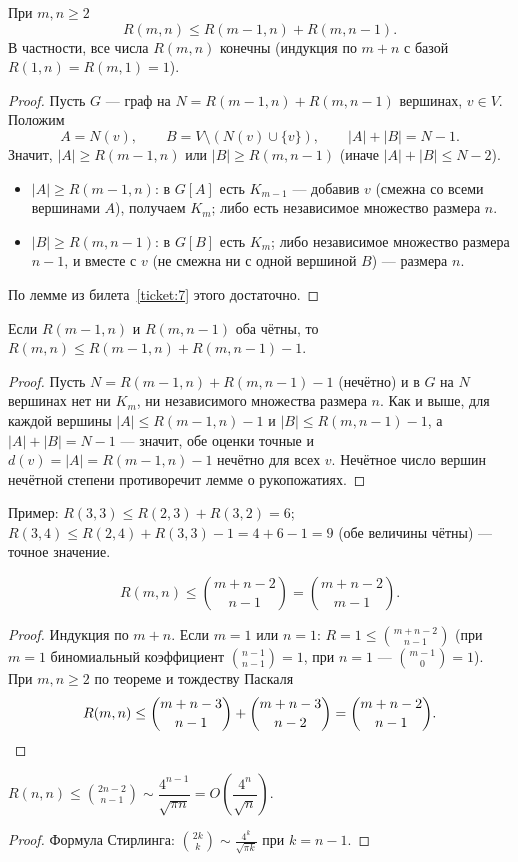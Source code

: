 \begin{theorem}
При \(m,n\ge2\)
\[
R(m,n)\le R(m-1,n)+R(m,n-1).
\]
В частности, все числа \(R(m,n)\) конечны (индукция по \(m+n\) с базой \(R(1,n)=R(m,1)=1\)).
\end{theorem}
\begin{proof}
Пусть \(G\) — граф на \(N=R(m-1,n)+R(m,n-1)\) вершинах, \(v\in V\). Положим
\[
A=N(v),\qquad B=V\setminus(N(v)\cup\{v\}),\qquad |A|+|B|=N-1 .
\]
Значит, \(|A|\ge R(m-1,n)\) или \(|B|\ge R(m,n-1)\) (иначе \(|A|+|B|\le N-2\)).
\begin{itemize}\tightlist
\item \(|A|\ge R(m-1,n)\): в \(G[A]\) есть \(K_{m-1}\) — добавив \(v\) (смежна со всеми
  вершинами \(A\)), получаем \(K_m\); либо есть независимое множество размера \(n\).
\item \(|B|\ge R(m,n-1)\): в \(G[B]\) есть \(K_m\); либо независимое множество размера
  \(n-1\), и вместе с \(v\) (не смежна ни с одной вершиной \(B\)) — размера \(n\).
\end{itemize}
По лемме из билета~\ref{ticket:7} этого достаточно.
\end{proof}


\begin{theorem}
Если \(R(m-1,n)\) и \(R(m,n-1)\) оба чётны, то \(R(m,n)\le R(m-1,n)+R(m,n-1)-1\).
\end{theorem}
\begin{proof}
Пусть \(N=R(m-1,n)+R(m,n-1)-1\) (нечётно) и в \(G\) на \(N\) вершинах нет ни \(K_m\),
ни независимого множества размера \(n\). Как и выше, для каждой вершины
\(|A|\le R(m-1,n)-1\) и \(|B|\le R(m,n-1)-1\), а \(|A|+|B|=N-1\) — значит, обе оценки
точные и \(d(v)=|A|=R(m-1,n)-1\) нечётно для всех \(v\). Нечётное число вершин
нечётной степени противоречит лемме о рукопожатиях.
\end{proof}
Пример: \(R(3,3)\le R(2,3)+R(3,2)=6\); \(R(3,4)\le R(2,4)+R(3,3)-1=4+6-1=9\)
(обе величины чётны) — точное значение.

\begin{cor}
\[
R(m,n)\le\binom{m+n-2}{n-1}=\binom{m+n-2}{m-1}.
\]
\end{cor}
\begin{proof}
Индукция по \(m+n\). Если \(m=1\) или \(n=1\): \(R=1\le\binom{m+n-2}{n-1}\)
(при \(m=1\) биномиальный коэффициент \(\binom{n-1}{n-1}=1\), при \(n=1\) — \(\binom{m-1}{0}=1\)).
При \(m,n\ge2\) по теореме и тождеству Паскаля
\[
R(m,n)\le\binom{m+n-3}{n-1}+\binom{m+n-3}{n-2}=\binom{m+n-2}{n-1}.\qedhere
\]
\end{proof}
\begin{cor}
\(R(n,n)\le\binom{2n-2}{n-1}\sim\dfrac{4^{n-1}}{\sqrt{\pi n}}=O\!\left(\dfrac{4^n}{\sqrt n}\right)\).
\end{cor}
\begin{proof}
Формула Стирлинга: \(\binom{2k}{k}\sim\frac{4^k}{\sqrt{\pi k}}\) при \(k=n-1\).
\end{proof}
